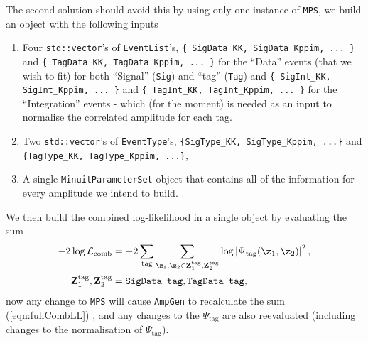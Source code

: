 \begin{frame}


The second solution should avoid this by using only one instance of \texttt{MPS}, we build an object with the following inputs
\begin{enumerate}
    \item Four \texttt{std::vector}'s of \texttt{EventList}'s, \texttt{\{ SigData\_KK, SigData\_Kppim, ... \}} and \texttt{\{ TagData\_KK, TagData\_Kppim, ... \}} for the ``Data'' events (that we wish to fit) for both ``Signal'' (\texttt{Sig}) and ``tag'' (\texttt{Tag}) and \texttt{\{ SigInt\_KK, SigInt\_Kppim, ... \}} and \texttt{\{ TagInt\_KK, TagInt\_Kppim, ... \}} for the ``Integration'' events - which (for the moment) is needed as an input to normalise the correlated amplitude for each tag.
    \item Two \texttt{std::vector}'s of \texttt{EventType}'s, \texttt{\{SigType\_KK, SigType\_Kppim, ...\}} and \texttt{\{TagType\_KK, TagType\_Kppim, ...\}},
    \item A single \texttt{MinuitParameterSet} object that contains all of the information for every amplitude we intend to build.
\end{enumerate}
\end{frame}
\begin{frame}
We then build the combined log-likelihood in a single object by evaluating the sum
\begin{equation}
    \begin{split}
    -2\log\mathcal{L}_\text{comb} &=-2 \sum_\text{tag} \sum_{\z_1,\z_2 \in \textbf{Z}^\text{tag}_1, \textbf{Z}^\text{tag}_2} \log\left|\Psi_\text{tag}(\z_1, \z_2)\right|^2, \\ 
    \mathbf{Z}^\text{tag}_1, \mathbf{Z}^\text{tag}_2 &= \texttt{SigData\_tag}, \texttt{TagData\_tag},\label{eqn:fullCombLL}
    \end{split}
\end{equation}
now any change to \texttt{MPS} will cause \texttt{AmpGen} to recalculate the sum (\ref{eqn:fullCombLL}) , and any changes to the $\Psi_\text{tag}$ are also reevaluated (including changes to the normalisation of $\Psi_\text{tag}$).
\end{frame}
